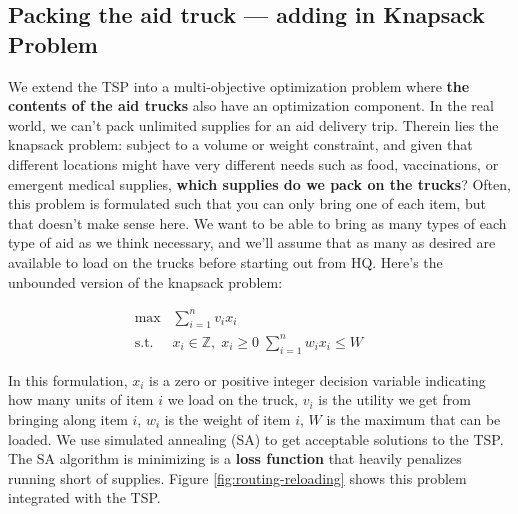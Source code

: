 \documentclass[a0,final]{a0poster}
\begin{document}
\begin{multicols}{3}
\columnbreak



\subsection*{Packing the aid truck --- adding in Knapsack Problem}

\vspace{-6mm}

We extend the TSP into a multi-objective optimization problem
where \textbf{the contents of the aid trucks} also have an optimization component. In the real world, we can't pack unlimited supplies for an aid delivery trip. Therein lies
the knapsack problem: subject to a volume or weight constraint, and given that different locations
might have very different needs such as food, vaccinations, or emergent medical supplies, \textbf{which supplies do we pack on the trucks}?  Often, this problem is formulated such that you can only bring one of each item, but that doesn't make sense here. We want to be able to bring as many types of each type of aid as we think necessary, and we'll assume that as many as desired are available to load on the trucks before starting out from HQ. Here's the unbounded version of the knapsack problem:

\vspace{-10mm}

\begin{align*}
\max &\sum_{i=1}^n v_i x_i &&  \\
\mathrm{s.t.} \; \; & x_i \in \mathbb{Z}, \; x_i \geq 0 \; \sum_{i=1}^n w_ix_i \leq W
\end{align*}

\noindent In this formulation, $x_{i}$ is a zero or positive integer decision variable indicating how many units of item $i$ we load on the truck, $v_i$ is the utility we get from bringing along item $i$, $w_i$ is the weight of item $i$, $W$ is the maximum that can be loaded. We use simulated annealing (SA) to get acceptable solutions to the TSP. The SA algorithm is minimizing is a \textbf{loss function} that heavily penalizes running short of supplies. Figure \ref{fig:routing-reloading} shows this problem integrated with the TSP.

\vspace{-6mm}


\end{multicols}
\end{document}
